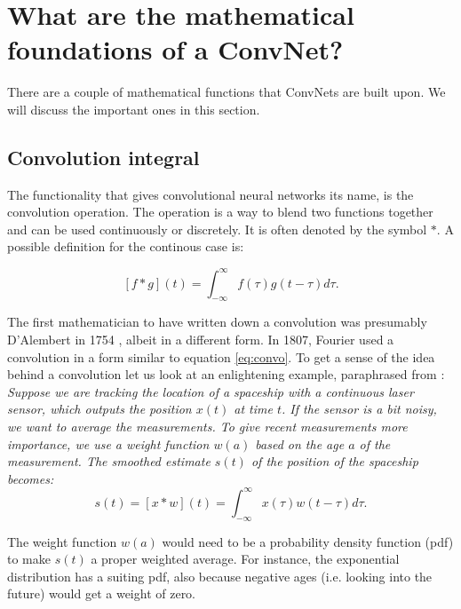 \section{What are the mathematical foundations of a ConvNet?}
\label{sec:math}

There are a couple of mathematical functions that ConvNets are built upon. We will discuss the important ones in this section.

\subsection{Convolution integral}

The functionality that gives convolutional neural networks its name, is the convolution operation. The operation is a way to blend two functions together \cite{wolf} and can be used continuously or discretely. It is often denoted by the symbol $*$. A possible definition for the continous case is:

\begin{equation}\label{eq:convo}
    [f * g] (t) = \int_{-\infty}^{\infty} f(\tau)g(t-\tau) d\tau.
\end{equation}

The first mathematician to have written down a convolution was presumably D'Alembert in 1754 \cite{tor}, albeit in a different form. In 1807, Fourier used a convolution in a form similar to equation \eqref{eq:convo}. To get a sense of the idea behind a convolution let us look at an enlightening example, paraphrased from \cite[Ch. 9]{dl-book}:\\

\textit{Suppose we are tracking the location of a spaceship with a continuous laser sensor, which outputs the position $x(t)$ at time $t$. If the sensor is a bit noisy, we want to average the measurements. To give recent measurements more importance, we use a weight function $w(a)$ based on the age $a$ of the measurement. The smoothed estimate $s(t)$ of the position of the spaceship becomes:
}
\begin{equation}
    s(t) = [x*w](t) = \int_{-\infty}^{\infty} x(\tau)w(t-\tau)d\tau.
\end{equation}

The weight function $w(a)$ would need to be a probability density function (pdf) to make $s(t)$ a proper weighted average. For instance, the exponential distribution has a suiting pdf, also because negative ages (i.e. looking into the future) would get a weight of zero.\\


